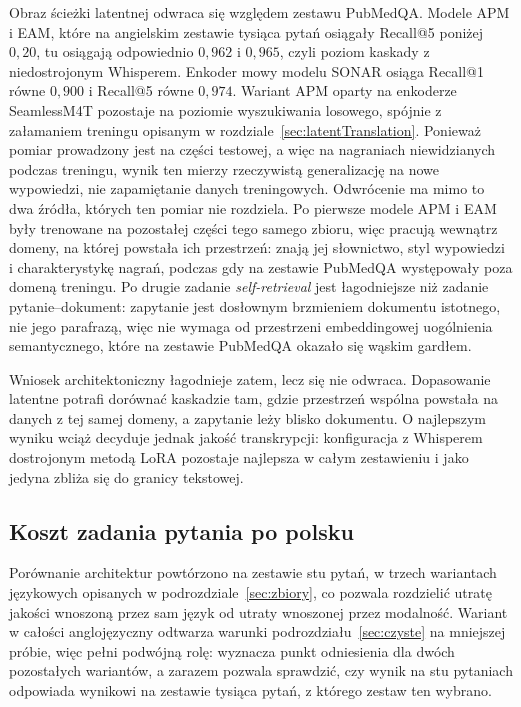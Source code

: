 Obraz ścieżki latentnej odwraca się względem zestawu PubMedQA. Modele APM i EAM, które na
angielskim zestawie tysiąca pytań osiągały Recall@5 poniżej $0{,}20$, tu osiągają odpowiednio
$0{,}962$ i $0{,}965$, czyli poziom kaskady z niedostrojonym Whisperem. Enkoder mowy modelu
SONAR osiąga Recall@1 równe $0{,}900$ i Recall@5 równe $0{,}974$. Wariant APM oparty na
enkoderze SeamlessM4T pozostaje na poziomie wyszukiwania losowego, spójnie z załamaniem
treningu opisanym w rozdziale~\ref{sec:latentTranslation}. Ponieważ pomiar prowadzony jest na
części testowej, a więc na nagraniach niewidzianych podczas treningu, wynik ten mierzy
rzeczywistą generalizację na nowe wypowiedzi, nie zapamiętanie danych treningowych. Odwrócenie
ma mimo to dwa źródła, których ten pomiar nie rozdziela. Po pierwsze modele APM i EAM były
trenowane na pozostałej części tego samego zbioru, więc pracują wewnątrz domeny, na której
powstała ich przestrzeń: znają jej słownictwo, styl wypowiedzi i charakterystykę nagrań,
podczas gdy na zestawie PubMedQA występowały poza domeną treningu. Po drugie zadanie
\textit{self-retrieval} jest łagodniejsze niż zadanie
pytanie--dokument: zapytanie jest dosłownym brzmieniem dokumentu istotnego, nie jego parafrazą,
więc nie wymaga od przestrzeni embeddingowej uogólnienia semantycznego, które na zestawie
PubMedQA okazało się wąskim gardłem.

Wniosek architektoniczny łagodnieje zatem, lecz się nie odwraca. Dopasowanie latentne potrafi
dorównać kaskadzie tam, gdzie przestrzeń wspólna powstała na danych z tej samej domeny,
a zapytanie leży blisko dokumentu. O najlepszym wyniku wciąż decyduje jednak jakość
transkrypcji: konfiguracja z Whisperem dostrojonym metodą LoRA pozostaje najlepsza w całym
zestawieniu i jako jedyna zbliża się do granicy tekstowej.

\subsection{Koszt zadania pytania po polsku}
\label{sec:jezyk}
Porównanie architektur powtórzono na zestawie stu pytań, w trzech wariantach językowych
opisanych w podrozdziale~\ref{sec:zbiory}, co pozwala rozdzielić utratę jakości wnoszoną przez sam
język od utraty wnoszonej przez modalność. Wariant w całości anglojęzyczny odtwarza
warunki podrozdziału~\ref{sec:czyste} na mniejszej próbie, więc pełni podwójną rolę: wyznacza punkt
odniesienia dla dwóch pozostałych wariantów, a zarazem pozwala sprawdzić, czy wynik na stu
pytaniach odpowiada wynikowi na zestawie tysiąca pytań, z którego zestaw ten wybrano.

